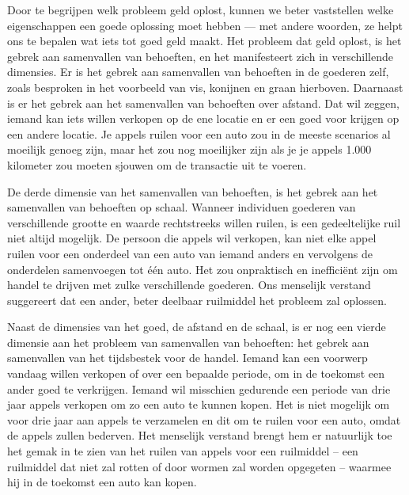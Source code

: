 Door te begrijpen welk probleem geld oplost, kunnen we beter vaststellen welke eigenschappen een goede oplossing moet hebben --- met andere woorden, ze helpt ons te bepalen wat iets tot goed geld maakt. Het probleem dat geld oplost, is het gebrek aan samenvallen van behoeften, en het manifesteert zich in verschillende dimensies. Er is het gebrek aan samenvallen van behoeften in de goederen zelf, zoals besproken in het voorbeeld van vis, konijnen en graan hierboven. Daarnaast is er het gebrek aan het samenvallen van behoeften over afstand. Dat wil zeggen, iemand kan iets willen verkopen op de ene locatie en er een goed voor krijgen op een andere locatie. Je appels ruilen voor een auto zou in de meeste scenario\textquotesingle s al moeilijk genoeg zijn, maar het zou nog moeilijker zijn als je je appels 1.000 kilometer zou moeten sjouwen om de transactie uit te voeren.

De derde dimensie van het samenvallen van behoeften, is het gebrek aan het samenvallen van behoeften op schaal. Wanneer individuen goederen van verschillende grootte en waarde rechtstreeks willen ruilen, is een gedeeltelijke ruil niet altijd mogelijk. De persoon die appels wil verkopen, kan niet elke appel ruilen voor een onderdeel van een auto van iemand anders en vervolgens de onderdelen samenvoegen tot één auto. Het zou onpraktisch en inefficiënt zijn om handel te drijven met zulke verschillende goederen. Ons menselijk verstand suggereert dat een ander, beter deelbaar ruilmiddel het probleem zal oplossen.

Naast de dimensies van het goed, de afstand en de schaal, is er nog een vierde dimensie aan het probleem van samenvallen van behoeften: het gebrek aan samenvallen van het tijdsbestek voor de handel. Iemand kan een voorwerp vandaag willen verkopen of over een bepaalde periode, om in de toekomst een ander goed te verkrijgen. Iemand wil misschien gedurende een periode van drie jaar appels verkopen om zo een auto te kunnen kopen. Het is niet mogelijk om voor drie jaar aan appels te verzamelen en dit om te ruilen voor een auto, omdat de appels zullen bederven. Het menselijk verstand brengt hem er natuurlijk toe het gemak in te zien van het ruilen van appels voor een ruilmiddel -- een ruilmiddel dat niet zal rotten of door wormen zal worden opgegeten -- waarmee hij in de toekomst een auto kan kopen.

